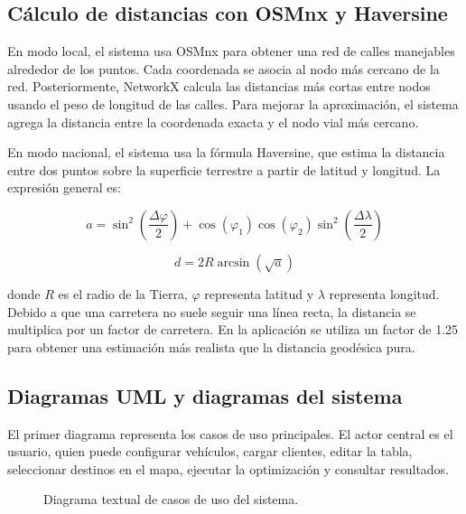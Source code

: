 \documentclass[runningheads]{llncs}
\begin{document}
\subsection{C\'alculo de distancias con OSMnx y Haversine}

En modo local, el sistema usa OSMnx para obtener una red de calles manejables
alrededor de los puntos. Cada coordenada se asocia al nodo m\'as cercano de la
red. Posteriormente, NetworkX calcula las distancias m\'as cortas entre nodos
usando el peso de longitud de las calles. Para mejorar la aproximaci\'on, el
sistema agrega la distancia entre la coordenada exacta y el nodo vial m\'as
cercano.

En modo nacional, el sistema usa la f\'ormula Haversine, que estima la distancia
entre dos puntos sobre la superficie terrestre a partir de latitud y longitud.
La expresi\'on general es:

\begin{equation}
a = \sin^2\left(\frac{\Delta \varphi}{2}\right) +
\cos(\varphi_1)\cos(\varphi_2)\sin^2\left(\frac{\Delta \lambda}{2}\right)
\end{equation}

\begin{equation}
d = 2R\arcsin(\sqrt{a})
\end{equation}

donde $R$ es el radio de la Tierra, $\varphi$ representa latitud y $\lambda$
representa longitud. Debido a que una carretera no suele seguir una l\'inea
recta, la distancia se multiplica por un factor de carretera. En la aplicaci\'on
se utiliza un factor de 1.25 para obtener una estimaci\'on m\'as realista que la
distancia geod\'esica pura.

\subsection{Diagramas UML y diagramas del sistema}

El primer diagrama representa los casos de uso principales. El actor central es
el usuario, quien puede configurar veh\'iculos, cargar clientes, editar la tabla,
seleccionar destinos en el mapa, ejecutar la optimizaci\'on y consultar
resultados.

\begin{figure}
\centering
{}
\caption{Diagrama textual de casos de uso del sistema.}
\label{fig:casos-uso}
\end{figure}
\end{document}
